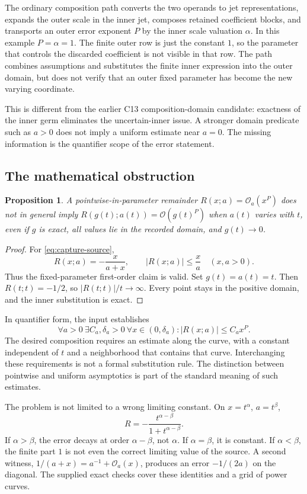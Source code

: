 \documentclass[11pt,a4paper]{article}
\newtheorem{proposition}{Proposition}[section]
\newcommand{\OO}{\mathcal O}
\begin{document}
The ordinary composition path converts the two operands to jet representations, expands the outer scale in the inner jet, composes retained coefficient blocks, and transports an outer error exponent $P$ by the inner scale valuation $\alpha$. In this example $P=\alpha=1$. The finite outer row is just the constant $1$, so the parameter that controls the discarded coefficient is not visible in that row. The path combines assumptions and substitutes the finite inner expression into the outer domain, but does not verify that an outer fixed parameter has become the new varying coordinate.\cite{operations}

This is different from the earlier C13 composition-domain candidate: exactness of the inner germ eliminates the uncertain-inner issue. A stronger domain predicate such as $a>0$ does not imply a uniform estimate near $a=0$. The missing information is the quantifier scope of the error statement.

\subsection{The mathematical obstruction}

\begin{proposition}\label{prop:capture}
A pointwise-in-parameter remainder $R(x;a)=\OO_a(x^P)$ does not in general imply $R(g(t);a(t))=\OO(g(t)^P)$ when $a(t)$ varies with $t$, even if $g$ is exact, all values lie in the recorded domain, and $g(t)\to0$.
\end{proposition}
\begin{proof}
For \eqref{eq:capture-source},
\[
 R(x;a)=-\frac{x}{a+x},\qquad |R(x;a)|\le\frac{x}{a}\quad(x,a>0).
\]
Thus the fixed-parameter first-order claim is valid. Set $g(t)=a(t)=t$. Then $R(t;t)=-1/2$, so $|R(t;t)|/t\to\infty$. Every point stays in the positive domain, and the inner substitution is exact.\end{proof}

In quantifier form, the input establishes
\[
 \forall a>0\ \exists C_a,\delta_a>0\ \forall x\in(0,\delta_a):
 |R(x;a)|\le C_a x^P.
\]
The desired composition requires an estimate along the curve, with a constant independent of $t$ and a neighborhood that contains that curve. Interchanging these requirements is not a formal substitution rule. The distinction between pointwise and uniform asymptotics is part of the standard meaning of such estimates.\cite{dlmf-definitions}

The problem is not limited to a wrong limiting constant. On $x=t^\alpha$, $a=t^\beta$,
\begin{equation}\label{eq:curves}
 R=-\frac{t^{\alpha-\beta}}{1+t^{\alpha-\beta}}.
\end{equation}
If $\alpha>\beta$, the error decays at order $\alpha-\beta$, not $\alpha$. If $\alpha=\beta$, it is constant. If $\alpha<\beta$, the finite part $1$ is not even the correct limiting value of the source. A second witness, $1/(a+x)=a^{-1}+\OO_a(x)$, produces an error $-1/(2a)$ on the diagonal. The supplied exact checks cover these identities and a grid of power curves.
\end{document}
